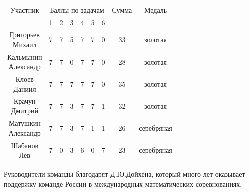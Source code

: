 \documentclass[a4paper,12pt]{article}
\begin{document}
\begin{multicols}{2}
    {\par \hspace*{-0.9cm}
    \begin{tabular}{c c c c c c c c c}
        Участник & \multicolumn{6}{c}{Баллы по задачам} & Сумма & Медаль \\ 
        & 1 & 2 & 3 & 4 & 5 & 6 & & \\ 
        \makecell[{{p{1.5cm}}}]{\raggedright Григорьев\\Михаил} & 7 & 7 & 5 & 7 & 7 & 0 & 33 & золотая \\ 
        \makecell[{{p{1.5cm}}}]{\raggedright Кальмынин\\Александр} & 7 & 7 & 0 & 7 & 7 & 0 & 28 & золотая \\ 
        \makecell[{{p{1.5cm}}}]{\raggedright Клоев\\Даниил} & 7 & 7 & 7 & 7 & 7 & 0 & 35 & золотая \\ 
        \makecell[{{p{1.5cm}}}]{\raggedright Крачун\\Дмитрий} & 7 & 7 & 3 & 7 & 7 & 1 & 32 & золотая \\ 
        \makecell[{{p{1.5cm}}}]{\raggedright Матушкин\\Александр} & 7 & 7 & 3 & 7 & 1 & 1 & 26 & серебряная \\ 
        \makecell[{{p{1.5cm}}}]{\raggedright Шабанов\\Лев} & 7 & 0 & 3 & 6 & 0 & 7 & 23 & серебряная \\ 
    \end{tabular}
    }
    {\par \hspace*{0.2cm}Руководители команды благодарят Д.Ю.Дойхена, который много лет оказывает поддержку команде России в международных математических соревнованиях. }

\end{multicols}
\end{document}
